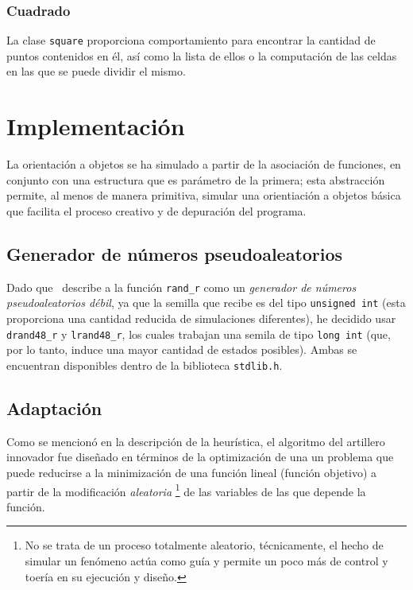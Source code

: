 \documentclass[a4paper]{report}
\begin{document}
  \subsection{Cuadrado}
  La clase \texttt{square} proporciona comportamiento para encontrar la cantidad de puntos
  contenidos en \'el, as\'i como la lista de ellos o la computaci\'on de las celdas en las
  que se puede dividir el mismo.

  \chapter{Implementaci\'on}
  La orientaci\'on a objetos se ha simulado a partir de la asociaci\'on de funciones, en
  conjunto con una estructura que es par\'ametro de la primera; esta abstracci\'on permite,
  al menos de manera primitiva, simular una orientiaci\'on a objetos b\'asica que facilita
  el proceso creativo y de depuraci\'on del programa.

  \section{Generador de n\'umeros pseudoaleatorios}

  Dado que~\cite{rand_r} describe a la funci\'on \texttt{rand\_r} como un \textit{generador de
    n\'umeros pseudoaleatorios d\'ebil}, ya que la semilla que recibe es del tipo
  \texttt{unsigned int} (esta proporciona una cantidad reducida de simulaciones
  diferentes), he decidido usar \texttt{drand48\_r} y \texttt{lrand48\_r}, los cuales trabajan
  una semila de tipo \texttt{long int} (que, por lo tanto, induce una mayor cantidad de estados
  posibles). Ambas se encuentran disponibles dentro de la biblioteca \texttt{stdlib.h}.

  \section{Adaptaci\'on}
  Como se mencion\'o en la descripci\'on de la heur\'istica, el algoritmo del artillero innovador
  fue dise\~nado en t\'erminos de la optimizaci\'on de una un problema que puede reducirse
  a la minimizaci\'on de una funci\'on lineal (funci\'on objetivo) a partir de la modificaci\'on
  \textit{aleatoria} \footnote{No se trata de un proceso totalmente aleatorio, t\'ecnicamente, el hecho de
    simular un fen\'omeno act\'ua como gu\'ia y permite un poco m\'as de control y toer\'ia en su
    ejecuci\'on y dise\~no.} de las variables de las que depende la funci\'on.
\end{document}
